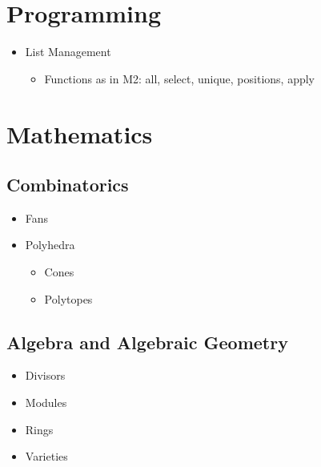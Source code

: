 \documentclass[a4paper]{article}
\begin{document}
\section{Programming}
\begin{itemize}
	\item[] List Management
	\begin{itemize}
		\item[] Functions as in M2: all, select, unique, positions, apply
	\end{itemize}
\end{itemize}
\section{Mathematics}
\subsection{Combinatorics}
\begin{itemize}
	\item[] Fans
	\item[] Polyhedra
	\begin{itemize}
		\item[] Cones
		\item[] Polytopes
	\end{itemize}
\end{itemize}
\subsection{Algebra and Algebraic Geometry}
\begin{itemize}
	\item[] Divisors
	\item[] Modules
	\item[] Rings
	\item[] Varieties
\end{itemize}
\end{document}
